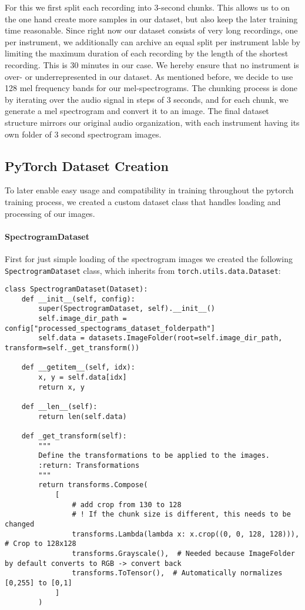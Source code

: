 For this we first split each recording into 3-second chunks. This allows us to on the one hand create more samples in our dataset, but also keep the later training time reasonable.
Since right now our dataset consists of very long recordings, one per instrument, we additionally can archive an equal split per instrument lable by limiting the maximum duration of each recording by the length of the shortest recording.
This is 30 minutes in our case.
We hereby ensure that no instrument is over- or underrepresented in our dataset.
As mentioned before, we decide to use 128 mel frequency bands for our mel-spectrograms.
The chunking process is done by iterating over the audio signal in steps of 3 seconds, and for each chunk, we generate a mel spectrogram and convert it to an image.
The final dataset structure mirrors our original audio organization, with each instrument having its own folder of 3 second spectrogram images.




\subsection{PyTorch Dataset Creation}
To later enable easy usage and compatibility in training throughout the pytorch training process, we created a custom dataset class that handles loading and processing of our images.

\paragraph{SpectrogramDataset}
First for just simple loading of the spectrogram images we created the following \texttt{SpectrogramDataset} class, which inherits from \texttt{torch.utils.data.Dataset}:

\begin{lstlisting}[caption=Custom Dataset Class]
class SpectrogramDataset(Dataset):
    def __init__(self, config):
        super(SpectrogramDataset, self).__init__()
        self.image_dir_path = config["processed_spectograms_dataset_folderpath"]
        self.data = datasets.ImageFolder(root=self.image_dir_path, transform=self._get_transform())

    def __getitem__(self, idx):
        x, y = self.data[idx]
        return x, y

    def __len__(self):
        return len(self.data)

    def _get_transform(self):
        """
        Define the transformations to be applied to the images.
        :return: Transformations
        """
        return transforms.Compose(
            [
                # add crop from 130 to 128
                # ! If the chunk size is different, this needs to be changed
                transforms.Lambda(lambda x: x.crop((0, 0, 128, 128))),  # Crop to 128x128
                transforms.Grayscale(),  # Needed because ImageFolder by default converts to RGB -> convert back
                transforms.ToTensor(),  # Automatically normalizes [0,255] to [0,1]
            ]
        )

\end{lstlisting}


